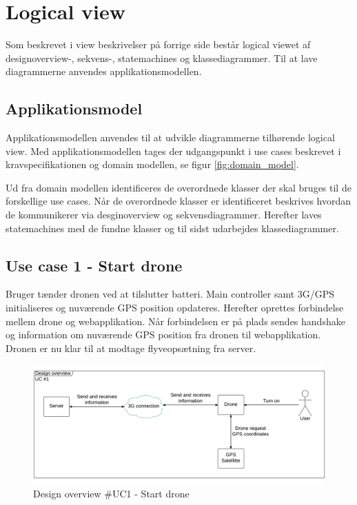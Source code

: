 \section{Logical view}

Som beskrevet i view beskrivelser på forrige side består logical viewet af designoverview-, sekvens-, statemachines og klassediagrammer. Til at lave diagrammerne anvendes applikationsmodellen.

\subsection{Applikationsmodel}
Applikationsmodellen anvendes til at udvikle diagrammerne tilhørende logical view. Med applikationsmodellen tages der udgangspunkt i use cases beskrevet i kravspecifikationen og domain modellen, se figur \ref{fig:domain_model}.
  
Ud fra domain modellen identificeres de overordnede klasser der skal bruges til de forskellige use cases. Når de overordnede klasser er identificeret beskrives hvordan de kommunikerer via desginoverview og sekvensdiagrammer. Herefter laves statemachines med de fundne klasser og til sidst udarbejdes klassediagrammer.


\subsection{Use case 1 - Start drone}

Bruger tænder dronen ved at tilslutter batteri. Main controller samt 3G/GPS initialiseres og nuværende GPS position opdateres.
Herefter oprettes forbindelse mellem drone og webapplikation. Når forbindelsen er på plads sendes handshake og information om nuværende GPS position fra dronen til webapplikation. Dronen er nu klar til at modtage flyveopsætning fra server.

\vspace{-5pt}
\begin{figure}[H]
	\centering
	\includegraphics[width=1\textwidth]{Billeder/design_overview/design_overview_UC1.png}
	\vspace{-1cm}
	\caption{Design overview \#UC1 - Start drone}
	\label{fig:design_overview_UC1}
\end{figure}


